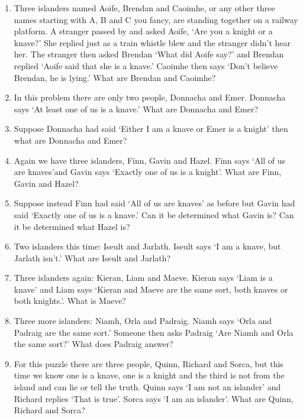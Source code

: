 \documentclass[12pt]{article}
\begin{document}
\begin{enumerate}

\item Three islanders named Aoife, Brendan and Caoimhe, or any other
  three names starting with A, B and C you fancy, are standing
  together on a railway platform. A stranger passed by and asked
  Aoife, \lq{}Are you a knight or a knave?\rq{} She replied just as a
  train whistle blew and the stranger didn't hear her. The stranger
  then asked Brendan \lq{}What did Aoife say?\rq{} and Brendan replied 
  \lq{}Aoife said that she is a knave.\rq{} Caoimhe then says 
  \lq{}Don't believe Brendan, he is lying.\rq{} What are Brendan and
  Caoimhe?

\item In this problem there are only two people, Donnacha and
  Emer. Donnacha says \lq{}At least one of us is a knave.\rq{} What
  are Donnacha and Emer?

\item Suppose Donnacha had said \lq{}Either I am a knave or Emer is a
  knight\rq{} then what are Donnacha and Emer?

\item Again we have three islanders, Finn, Gavin and Hazel. Finn says 
  \lq{}All of us are knaves\rq and Gavin says \lq{}Exactly one of us
  is a knight\rq{}. What are Finn, Gavin and Hazel?

\item Suppose instead Finn had said \lq{}All of us are knaves\rq{} as
  before but Gavin had said \lq{}Exactly one of us is a knave.\rq{}
  Can it be determined what Gavin is? Can it be determined what Hazel
  is?

\item Two islanders this time: Iseult and Jarlath. Iseult says \lq{}I
  am a knave, but Jarlath isn't.\rq{} What are Iseult and Jarlath?

\item Three islanders again: Kieran, Liam and Maeve. Kieran says 
  \lq{}Liam is a knave\rq{} and Liam says \lq{}Kieran and Maeve are
  the same sort, both knaves or both knights.\rq{}. What is Maeve?

\item Three more islanders: Niamh, Orla and Padraig. Niamh says \lq{}Orla
  and Padraig are the same sort.\rq{} Someone then asks Padraig \lq{}Are Niamh
  and Orla the same sort?\rq{} What does Padraig answer?

\item For this puzzle there are three people, Quinn, Richard and Sorca, but
  this time we know one is a knave, one is a knight and the third is
  not from the island and can lie or tell the truth. Quinn says \lq{}I
  am not an islander\rq{} and Richard replies \lq{}That is true\rq{}. Sorca
  says \lq{}I am an islander\rq{}. What are Quinn, Richard and Sorca?


\end{enumerate}
\end{document}
